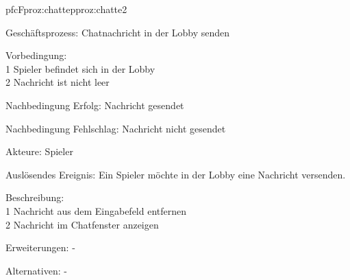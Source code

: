 \begin{description}[leftmargin=3em, style=sameline]
	
	\begin{php}{pfc}{F}{proz:chatte}{pproz:chatte2}
		\item [Geschäftsprozess:] Chatnachricht in der Lobby senden
		\item [Vorbedingung:]\hfill\\
		1 Spieler befindet sich in der Lobby \\
		2 Nachricht ist nicht leer
		\item [Nachbedingung Erfolg:] Nachricht gesendet
		\item [Nachbedingung Fehlschlag:] Nachricht nicht gesendet
		\item [Akteure:] Spieler
		\item [Auslösendes Ereignis:] Ein Spieler möchte in der Lobby eine Nachricht versenden.
		\item [Beschreibung:] \hfill\\
		1 Nachricht aus dem Eingabefeld entfernen \\
		2 Nachricht im Chatfenster anzeigen
		\item [Erweiterungen:] -
		\item [Alternativen:] -	
	\end{php}
	

\end{description}
